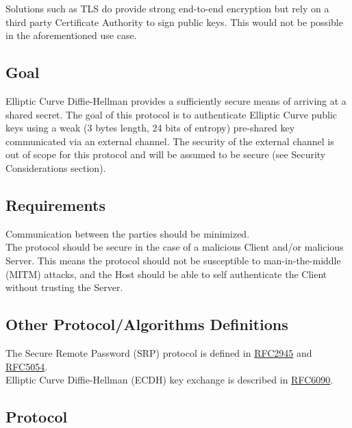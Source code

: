 \documentclass{article}
\begin{document}
    Solutions such as TLS do provide strong end-to-end encryption but rely on a
    third party Certificate Authority to sign public keys. This would not be
    possible in the aforementioned use case.\\

    \subsection{Goal}

    Elliptic Curve Diffie-Hellman provides a sufficiently secure means of arriving
    at a shared secret. The goal of this protocol is to authenticate Elliptic Curve public keys
    using a weak (3 bytes length, 24 bits of entropy) pre-shared key communicated
    via an external channel. The security of the external channel is out of scope
    for this protocol and will be assumed to be secure (see Security Considerations
    section).\\

    \subsection{Requirements}

    Communication between the parties should be minimized.\\

    The protocol should be secure in the case of a malicious Client and/or malicious
    Server. This means the protocol should not be susceptible to man-in-the-middle
    (MITM) attacks, and the Host should be able to self authenticate the Client
    without trusting the Server.\\

    \subsection{Other Protocol/Algorithms Definitions}

    The Secure Remote Password (SRP) protocol is defined in
    \href{(https://datatracker.ietf.org/doc/html/rfc2945}{RFC2945} and
    \href{https://datatracker.ietf.org/doc/html/rfc5054}{RFC5054}.\\

    Elliptic Curve Diffie-Hellman (ECDH) key exchange is described in
    \href{https://datatracker.ietf.org/doc/html/rfc60904}{RFC6090}.\\

    \subsection{Protocol}
\end{document}
